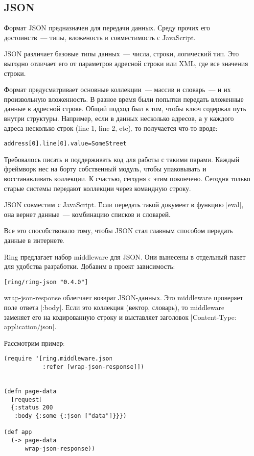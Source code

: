 \subsection{JSON}

Формат JSON предназначен для передачи данных. Среду прочих его достоинств~---
типы, вложеность и совместимость с JavaScript.

JSON различает базовые типы данных~--- числа, строки, логический тип. Это выгодно
отличает его от параметров адресной строки или XML, где все значения строки.

Формат предусматривает основные коллекции~--- массив и словарь~--- и их произвольную
вложенность. В разное время были попытки передать вложенные данные в адресной
строке. Общий подход был в том, чтобы ключ содержал путь внутри
структуры. Например, если в данных несколько адресов, а у каждого адреса
несколько строк (line 1, line 2, etc), то получается что-то вроде:

\begin{verbatim}
address[0].line[0].value=SomeStreet
\end{verbatim}

Требовалось писать и поддерживать код для работы с такими парами. Каждый
фреймворк нес на борту собственный модуль, чтобы упаковывать и восстанавливать
коллекции. К счастью, сегодня с этим покончено. Сегодня только старые системы
передают коллекции через командную строку.

JSON совместим с JavaScript. Если передать такой документ в функцию \spverb|eval|, она
вернет данные~--- комбинацию списков и словарей.

Все это способствовало тому, чтобы JSON стал главным способом передать данные в
интернете.

Ring предлагает набор middleware для JSON. Они вынесены в отдельный пакет для
удобства разработки. Добавим в проект зависимость:

\begin{verbatim}
[ring/ring-json "0.4.0"]
\end{verbatim}

wrap-json-response облегчает возврат JSON-данных. Это middleware проверяет поле
ответа \spverb|:body|. Если это коллекция (вектор, словарь), то middleware заменяет его
на кодированную строку и выставляет заголовок \spverb|Content-Type: application/json|.


Рассмотрим пример:

\begin{verbatim}
(require '[ring.middleware.json
           :refer [wrap-json-response]])


(defn page-data
  [request]
  {:status 200
   :body {:some {:json ["data"]}}})

(def app
  (-> page-data
      wrap-json-response))
\end{verbatim}

